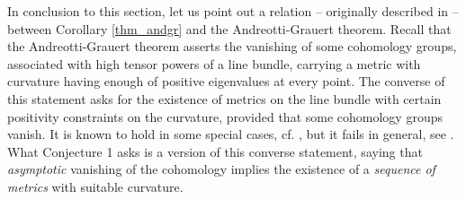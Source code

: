 \documentclass[12pt]{article}
\numberwithin{equation}{section}
\theoremstyle{theorem}
\theoremstyle{definition}
\theoremstyle{remark}
\newtheorem{rem}[thm]{Remark}
\begin{document}

	\par 
	In conclusion to this section, let us point out a relation -- originally described in \cite{DemAndrGrau} -- between Corollary \ref{thm_andgr} and the Andreotti-Grauert theorem. 
	Recall that the Andreotti-Grauert theorem asserts the vanishing of some cohomology groups, associated with high tensor powers of a line bundle, carrying a metric with curvature having enough of positive eigenvalues at every point.
	The converse of this statement asks for the existence of metrics on the line bundle with certain positivity constraints on the curvature, provided that some cohomology groups vanish.
	It is known to hold in some special cases, cf. \cite{YangAndrGra}, but it fails in general, see \cite{Ottem}.
	What Conjecture 1 asks is a version of this converse statement, saying that \textit{asymptotic} vanishing of the cohomology implies the existence of a \textit{sequence of metrics} with suitable curvature.
	
\end{document}
